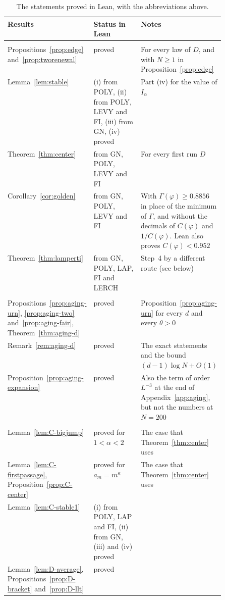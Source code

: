
\begin{table}[t]
\centering\footnotesize
\setlength{\tabcolsep}{4pt}\renewcommand{\arraystretch}{0.9}
\caption{The statements proved in Lean, with the abbreviations above.}\label{tab:lean}
\begin{tabular}{@{}>{\raggedright\arraybackslash}p{0.28\linewidth}>{\raggedright\arraybackslash}p{0.22\linewidth}>{\raggedright\arraybackslash}p{}@{}}
\toprule
Results & Status in Lean & Notes\\
\midrule
\multicolumn{3}{@{}l}{\emph{Section~\ref{sec:heavy}}}\\
Propositions~\ref{prop:edge} and~\ref{prop:tworenewal} & proved & For every law of $D$, and
with $N\ge1$ in Proposition~\ref{prop:edge}\\
Lemma~\ref{lem:stable} & (i) from POLY, (ii) from POLY, LEVY and FI, (iii) from GN, (iv)
proved & Part (iv) for the value of $I_\alpha$\\
Theorem~\ref{thm:center} & from GN, POLY, LEVY and FI & For every first run $D$\\
Corollary~\ref{cor:golden} & from GN, POLY, LEVY and FI & With $\Gamma(\varphi)\ge0.8856$ in
place of the minimum of $\Gamma$, and without the decimals of $C(\varphi)$ and
$1/C(\varphi)$. Lean also proves $C(\varphi)<0.952$\\
Theorem~\ref{thm:lamperti} & from GN, POLY, LAP, FI and LERCH & Step~4 by a different route
(see below)\\
\midrule
\multicolumn{3}{@{}l}{\emph{Section~\ref{sec:aging}}}\\
Propositions~\ref{prop:aging-urn}, \ref{prop:aging-two} and~\ref{prop:aging-fair},
Theorem~\ref{thm:aging-d} & proved & Proposition~\ref{prop:aging-urn} for every $d$ and every
$\theta>0$\\
Remark~\ref{rem:aging-d} & proved & The exact statements and the bound $(d-1)\log N+O(1)$\\
Proposition~\ref{prop:aging-expansion} & proved & Also the term of order $L^{-3}$ at the end
of Appendix~\ref{app:aging}, but not the numbers at $N=200$\\
\midrule
\multicolumn{3}{@{}l}{\emph{Appendices}}\\
Lemma~\ref{lem:C-bigjump} & proved for $1<\alpha<2$ & The case that
Theorem~\ref{thm:center} uses\\
Lemma~\ref{lem:C-firstpassage}, Proposition~\ref{prop:C-center} & proved for
$a_m=m^\kappa$ & The case that Theorem~\ref{thm:center} uses\\
Lemma~\ref{lem:C-stable1} & (i) from POLY, LAP and FI, (ii) from GN, (iii) and (iv)
proved & \\
Lemma~\ref{lem:D-average}, Propositions~\ref{prop:D-bracket} and~\ref{prop:D-llt} & proved & \\
\bottomrule
\end{tabular}
\end{table}
